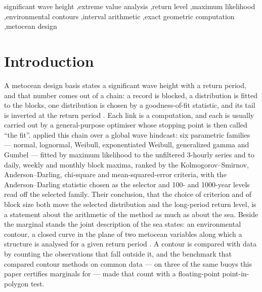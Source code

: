 \documentclass[preprint,11pt,authoryear]{elsarticle}
\begin{document}
\begin{frontmatter}
\begin{keyword}
significant wave height \sep extreme value analysis \sep return level \sep maximum likelihood \sep environmental contours \sep interval arithmetic \sep exact geometric computation \sep metocean design
\end{keyword}

\end{frontmatter}

\section{Introduction}\label{sec:intro}

A metocean design basis states a significant wave height with a return period, and that number comes out of a chain: a record is blocked, a distribution is fitted to the blocks, one distribution is chosen by a goodness-of-fit statistic, and its tail is inverted at the return period \citep{coles2001,dnv2021,iso19901}. Each link is a computation, and each is usually carried out by a general-purpose optimiser whose stopping point is then called ``the fit''. \citet{reis2026} applied this chain over a global wave hindcast: six parametric families --- normal, lognormal, Weibull, exponentiated Weibull, generalized gamma and Gumbel --- fitted by maximum likelihood to the unfiltered 3-hourly series and to daily, weekly and monthly block maxima, ranked by the Kolmogorov--Smirnov, Anderson--Darling, chi-square and mean-squared-error criteria, with the Anderson--Darling statistic chosen as the selector and 100- and 1000-year levels read off the selected family. Their conclusion, that the choice of criterion and of block size both move the selected distribution and the long-period return level, is a statement about the arithmetic of the method as much as about the sea. Beside the marginal stands the joint description of the sea states: an environmental contour, a closed curve in the plane of two metocean variables along which a structure is analysed for a given return period \citep{winterstein1993,haselsteiner2017,mackay2021}. A contour is compared with data by counting the observations that fall outside it, and the benchmark that compared contour methods on common data \citep{haselsteiner2021} --- on three of the same buoys this paper certifies marginals for --- made that count with a floating-point point-in-polygon test.
\end{document}
